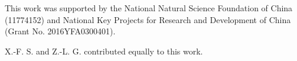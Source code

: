 \documentclass[amsmath,superscriptaddress,showpacs,aps,prb,twocolumn]{revtex4-1}
\begin{document}
\begin{acknowledgments}
\par This work was supported by the National Natural Science Foundation of China (11774152) and National Key Projects for Research and Development of China (Grant No. 2016YFA0300401).
\par X.-F. S. and Z.-L. G. contributed equally to this work.
\end{acknowledgments}


\end{document}
